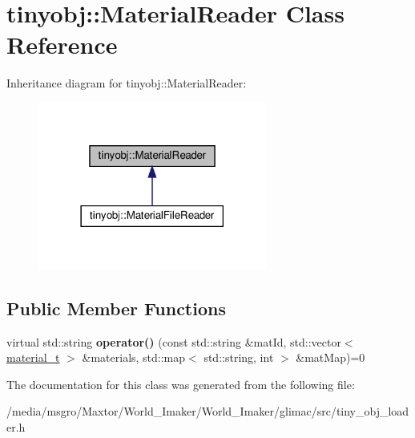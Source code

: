 \hypertarget{classtinyobj_1_1MaterialReader}{}\section{tinyobj\+:\+:Material\+Reader Class Reference}
\label{classtinyobj_1_1MaterialReader}


Inheritance diagram for tinyobj\+:\+:Material\+Reader\+:\nopagebreak
\begin{figure}[H]
\begin{center}
\leavevmode
\includegraphics[width=213pt]{classtinyobj_1_1MaterialReader__inherit__graph}
\end{center}
\end{figure}
\subsection*{Public Member Functions}
\begin{DoxyCompactItemize}
\item 
\mbox{\label{classtinyobj_1_1MaterialReader_afc27ac917abd33dc3ec4a9ae7a519962}} 
virtual std\+::string {\bfseries operator()} (const std\+::string \&mat\+Id, std\+::vector$<$ \hyperlink{structtinyobj_1_1material__t}{material\+\_\+t} $>$ \&materials, std\+::map$<$ std\+::string, int $>$ \&mat\+Map)=0
\end{DoxyCompactItemize}


The documentation for this class was generated from the following file\+:\begin{DoxyCompactItemize}
\item 
/media/msgro/\+Maxtor/\+World\+\_\+\+Imaker/\+World\+\_\+\+Imaker/glimac/src/tiny\+\_\+obj\+\_\+loader.\+h\end{DoxyCompactItemize}

